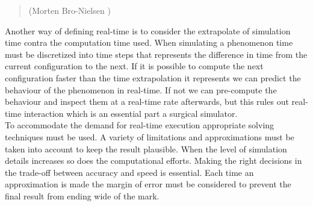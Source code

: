 \begin{quote}
\begin{flushright}
(Morten Bro-Nielsen
)
\end{flushright}
\end{quote} 

%
Another way of defining real-time is to consider 
the extrapolate of simulation time contra the computation time
used. When simulating a phenomenon time must be discretized into time
steps that represents the difference in time from the current
configuration to the next. If it is possible to compute the next
configuration faster than the time extrapolation it represents we can
predict the behaviour of the phenomenon in real-time. If not we can
pre-compute the behaviour and inspect them at a real-time rate
afterwards, but this rules out real-time interaction which is an
essential part a surgical simulator. \\

To accommodate the demand for real-time execution appropriate solving
techniques must be used. A variety of limitations and approximations
must be taken into account to keep the result plausible. 
When the level of simulation details increases so does the
computational efforts. Making the right decisions in the trade-off
between accuracy and speed is essential. 
%
Each time an
approximation is made the margin of error must be considered to
prevent the final result from ending wide of the mark. 


%



